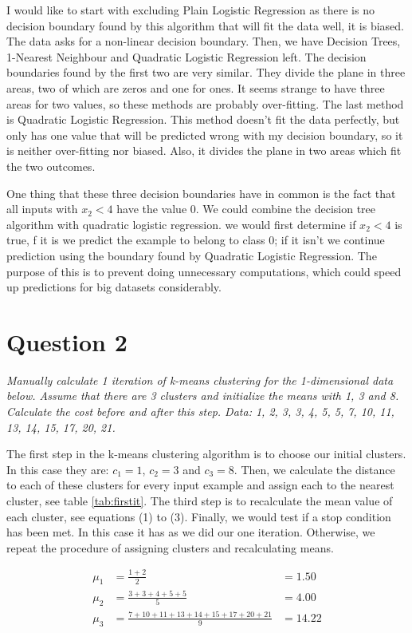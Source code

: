 \documentclass{article}
\begin{document}
I would like to start with excluding Plain Logistic Regression as there is no decision boundary found by this algorithm that will fit the data well, it is biased. The data asks for a non-linear decision boundary. Then, we have Decision Trees, 1-Nearest Neighbour and Quadratic Logistic Regression left. The decision boundaries found by the first two are very similar. They divide the plane in three areas, two of which are zeros and one for ones. It seems strange to have three areas for two values, so these methods are probably over-fitting. The last method is Quadratic Logistic Regression. This method doesn't fit the data perfectly, but only has one value that will be predicted wrong with my decision boundary, so it is neither over-fitting nor biased. Also, it divides the plane in two areas which fit the two outcomes. 

One thing that these three decision boundaries have in common is the fact that all inputs with $x_2 < 4$ have the value 0. We could combine the decision tree algorithm with quadratic logistic regression. we would first determine if $x_2 < 4$ is true, f it is we predict the example to belong to class 0; if it isn't we continue prediction using the boundary found by Quadratic Logistic Regression. The purpose of this is to prevent doing unnecessary computations, which could speed up predictions for big datasets considerably.

\section{Question 2} 
\textit{Manually calculate 1 iteration of k-means clustering for the 1-dimensional data below. Assume that there are 3 clusters and
initialize the means with 1, 3 and 8.  Calculate the cost before and after this step.
Data: 1, 2, 3, 3, 4, 5, 5, 7, 10, 11, 13, 14, 15, 17, 20, 21.}

The first step in the k-means clustering algorithm is to choose our initial clusters. In this case they are: $c_1 = 1$, $c_2 = 3$ and $c_3 = 8$. 
Then, we calculate the distance to each of these clusters for every input example and assign each to the nearest cluster, see table \ref{tab:firstit}.
The third step is to recalculate the mean value of each cluster, see equations (1) to (3). Finally, we would test if a stop condition has been met. In this case it has as we did our one iteration. 
Otherwise, we repeat the procedure of assigning clusters and recalculating means. 


\begin{align}
\mu_1 &= \frac{1 + 2}{2} &= 1.50\\
\mu_2 &= \frac{3+3+4+5+5}{5} &= 4.00\\
\mu_3 &= \frac{7+10+11+13+14+15+17+20+21}{9} &= 14.22
\end{align}
\end{document}
